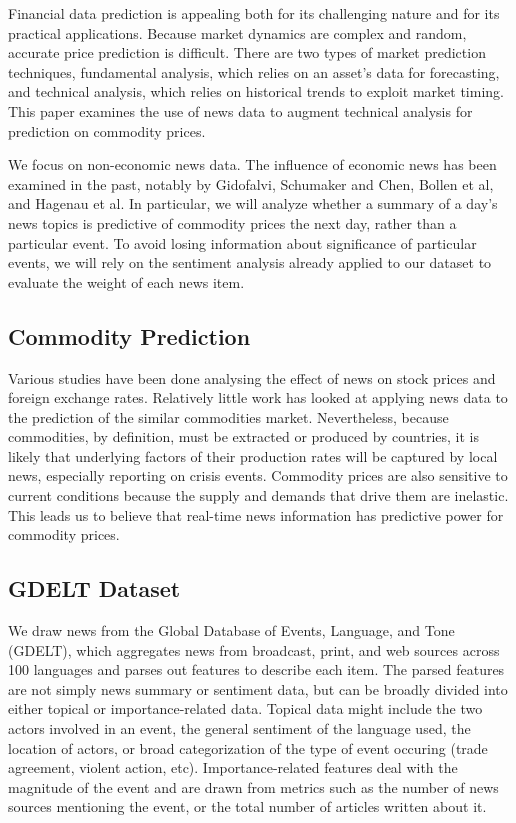 Financial data prediction is appealing both for its challenging nature and for its practical applications. Because market dynamics are complex and random, accurate price prediction is difficult. There are two types of market prediction techniques, fundamental analysis, which relies on an asset's data for forecasting, and technical analysis, which relies on historical trends to exploit market timing.\cite{schumaker2009textual} This paper examines the use of news data to augment technical analysis for prediction on commodity prices.

We focus on non-economic news data. The influence of economic news has been examined in the past, notably by Gidofalvi, Schumaker and Chen, Bollen et al, and Hagenau et al.\cite{gidofalvi2001using}\cite{schumaker2009textual}\cite{bollen2011twitter}\cite{hagenau2012automated} In particular, we will analyze whether a summary of a day's news topics is predictive of commodity prices the next day, rather than a particular event. To avoid losing information about significance of particular events, we will rely on the sentiment analysis already applied to our dataset to evaluate the weight of each news item.

\subsection{Commodity Prediction}
Various studies have been done analysing the effect of news on stock prices\cite{mcqueen1993stock} and foreign exchange rates\cite{kamruzzaman2003svm}. Relatively little work has looked at applying news data to the prediction of the similar commodities market. Nevertheless, because commodities, by definition, must be extracted or produced by countries, it is likely that underlying factors of their production rates will be captured by local news, especially reporting on crisis events. Commodity prices are also sensitive to current conditions because the supply and demands that drive them are inelastic.\cite{chen2008can} This leads us to believe that real-time news information has predictive power for commodity prices. 

\subsection{GDELT Dataset}
We draw news from the Global Database of Events, Language, and Tone (GDELT), which aggregates news from broadcast, print, and web sources across 100 languages and parses out features to describe each item. The parsed features are not simply news summary or sentiment data, but can be broadly divided into either topical or importance-related data. Topical data might include the two actors involved in an event, the general sentiment of the language used, the location of actors, or broad categorization of the type of event occuring (trade agreement, violent action, etc). Importance-related features deal with the magnitude of the event and are drawn from metrics such as the number of news sources mentioning the event, or the total number of articles written about it. 

